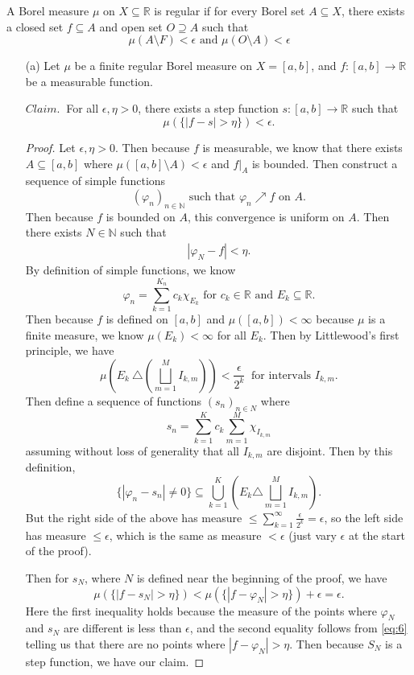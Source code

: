 \documentclass[12pt]{article}
\def\R{\mathbb{R}}
\def\N{\mathbb{N}}
\begin{document}
A Borel measure $\mu$ on $X \subseteq \R$ is regular if for every Borel set $A \subseteq X$, there exists a closed set $f \subseteq A$ and open set $O \supseteq A$ such that $$\mu(A \setminus F) < \epsilon \text{ and } \mu(O \setminus A) < \epsilon$$
\begin{itemize}
    \item[(a)] Let $\mu$ be a finite regular Borel measure on $X = [a, b]$, and $f : [a,b] \to \R$ be a measurable function.
    
    $Claim.~$ For all $\epsilon, \eta > 0$, there exists a step function $s : [a, b] \to \R$ such that $$ \mu( \{|f - s| > \eta\} ) < \epsilon.$$

    \begin{proof}
        Let $\epsilon, \eta > 0$. Then because $f$ is measurable, we know that there exists $A \subseteq [a, b]$ where $\mu([a, b] \setminus A) < \epsilon$ and $f|_A$ is bounded. Then construct a sequence of simple functions $$(\varphi_n)_{n \in \N} \text{ such that } \varphi_n \nearrow f \text{ on } A.$$ Then because $f$ is bounded on $A$, this convergence is uniform on $A$. Then there exists $N \in \N$ such that 
        \begin{align}
            | \varphi_N - f| < \eta. \label{eq:6}
        \end{align} By definition of simple functions, we know $$\varphi_n = \sum_{k=1}^{K_n} c_k \chi_{E_k} \text{ for } c_k \in \R \text{ and } E_k \subseteq \R.$$ Then because $f$ is defined on $[a, b]$ and $\mu ([a, b]) < \infty$ because $\mu$ is a finite measure, we know $\mu (E_k) < \infty$ for all $E_k$. Then by Littlewood's first principle, we have $$\mu \left( E_k ~\triangle \left( \bigsqcup_{m=1}^M I_{k, m}\right)\right) < \frac{\epsilon}{2^k} ~\text{ for intervals } I_{k,m}.$$ Then define a sequence of functions $(s_n)_{n \in N}$ where $$s_n = \sum_{k=1}^{K} c_k \sum_{m=1}^{M} \chi_{I_{k,m}}$$ assuming without loss of generality that all $I_{k, m}$ are disjoint. Then by this definition, $$\{|\varphi_n - s_n| \neq 0\} \subseteq \bigcup_{k=1}^K \left(E_k \triangle \bigsqcup_{m=1}^M I_{k, m}\right).$$ But the right side of the above has measure $\leq \sum_{k=1}^{\infty} \frac{\epsilon}{2^k} = \epsilon$, so the left side has measure $\leq \epsilon$, which is the same as measure $< \epsilon$ (just vary $\epsilon$ at the start of the proof). 

        Then for $s_N$, where $N$ is defined near the beginning of the proof, we have $$\mu( \{ |f - s_N| > \eta \}) <\mu( \{|f - \varphi_N | > \eta \}) + \epsilon = \epsilon.$$ Here the first inequality holds because the measure of the points where $\varphi_N$ and $s_N$ are different is less than $\epsilon$, and the second equality follows from \eqref{eq:6} telling us that there are no points where $|f - \varphi_N| > \eta$. Then because $S_N$ is a step function, we have our claim.
    \end{proof}


\end{itemize}
\end{document}
